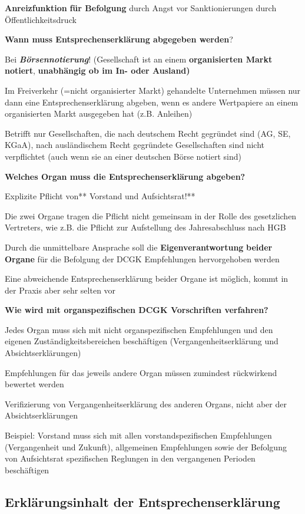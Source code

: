 \documentclass[
]{article}
\begin{document}
\textbf{Anreizfunktion} \textbf{für Befolgung} durch Angst vor
Sanktionierungen durch Öffentlichkeitsdruck

\textbf{Wann muss Entsprechenserklärung abgegeben werden}?

Bei \textbf{\emph{Börsennotierung}}! (Gesellschaft ist an einem
\textbf{organisierten Markt notiert}, \textbf{unabhängig ob im In- oder
Ausland)}

Im Freiverkehr (=nicht organisierter Markt) gehandelte Unternehmen
müssen nur dann eine Entsprechenserklärung abgeben, wenn es andere
Wertpapiere an einem organisierten Markt ausgegeben hat (z.B. Anleihen)

Betrifft nur Gesellschaften, die nach deutschem Recht gegründet sind
(AG, SE, KGaA), nach ausländischem Recht gegründete Gesellschaften sind
nicht verpflichtet (auch wenn sie an einer deutschen Börse notiert sind)

\textbf{Welches Organ muss die Entsprechenserklärung abgeben? }

Explizite Pflicht von** Vorstand und Aufsichtsrat!**

Die zwei Organe tragen die Pflicht nicht gemeinsam in der Rolle des
gesetzlichen Vertreters, wie z.B. die Pflicht zur Aufstellung des
Jahresabschluss nach HGB

Durch die unmittelbare Ansprache soll die \textbf{Eigenverantwortung}
\textbf{beider Organe} für die Befolgung der DCGK Empfehlungen
hervorgehoben werden

Eine abweichende Entsprechenserklärung beider Organe ist möglich, kommt
in der Praxis aber sehr selten vor

\textbf{Wie wird mit organspezifischen DCGK Vorschriften verfahren?}

Jedes Organ muss sich mit nicht organspezifischen Empfehlungen und den
eigenen Zuständigkeitsbereichen beschäftigen (Vergangenheitserklärung
und Absichtserklärungen)

Empfehlungen für das jeweils andere Organ müssen zumindest rückwirkend
bewertet werden

Verifizierung von Vergangenheitserklärung des anderen Organs, nicht aber
der Absichtserklärungen

Beispiel: Vorstand muss sich mit allen vorstandspezifischen Empfehlungen
(Vergangenheit und Zukunft), allgemeinen Empfehlungen sowie der
Befolgung von Aufsichtsrat spezifischen Reglungen in den vergangenen
Perioden beschäftigen

\hypertarget{erkluxe4rungsinhalt-der-entsprechenserkluxe4rung}{%
\subsection{Erklärungsinhalt der
Entsprechenserklärung}\label{erkluxe4rungsinhalt-der-entsprechenserkluxe4rung}}
\end{document}
